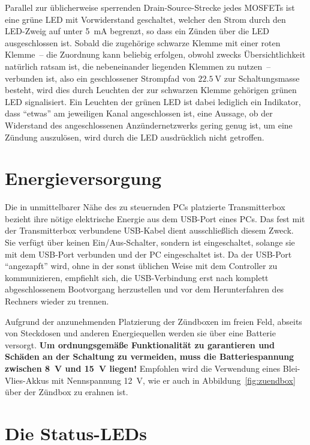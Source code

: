 \documentclass[paper=a4, parskip, numbers=noenddot, toc=listof, headsepline]{scrbook}
\begin{document}
			Parallel zur üblicherweise sperrenden Drain-Source-Strecke jedes MOSFETs ist eine grüne LED mit Vorwiderstand geschaltet, welcher den Strom durch den LED-Zweig auf unter \SI{5}{\milli\ampere} begrenzt, so dass ein Zünden über die LED ausgeschlossen ist. Sobald die zugehörige schwarze Klemme mit einer roten Klemme~-- die Zuordnung kann beliebig erfolgen, obwohl zwecks Übersichtlichkeit natürlich ratsam ist, die nebeneinander liegenden Klemmen zu nutzen~-- verbunden ist, also ein geschlossener Strompfad von $\SI{22,5}{\volt}$ zur Schaltungsmasse besteht, wird dies durch Leuchten der zur schwarzen Klemme gehörigen grünen LED signalisiert. Ein Leuchten der grünen LED ist dabei lediglich ein Indikator, dass \enquote{etwas} am jeweiligen Kanal angeschlossen ist, eine Aussage, ob der Widerstand des angeschlossenen Anzündernetzwerks gering genug ist, um eine Zündung auszulösen, wird durch die LED ausdrücklich nicht getroffen.

		\section{Energieversorgung}

			Die in unmittelbarer Nähe des zu steuernden PCs platzierte Transmitterbox bezieht ihre nötige elektrische Energie aus dem USB-Port eines PCs. Das fest mit der Transmitterbox verbundene USB-Kabel dient ausschließlich diesem Zweck. Sie verfügt über keinen Ein/Aus-Schalter, sondern ist eingeschaltet, solange sie mit dem USB-Port verbunden und der PC eingeschaltet ist. Da der USB-Port \enquote{angezapft} wird, ohne in der sonst üblichen Weise mit dem Controller zu kommunizieren, empfiehlt sich, die USB-Verbindung erst nach komplett abgeschlossenem Bootvorgang herzustellen und vor dem Herunterfahren des Rechners wieder zu trennen.

			Aufgrund der anzunehmenden Platzierung der Zündboxen im freien Feld, abseits von Steckdosen und anderen Energiequellen werden sie über eine Batterie versorgt. \textbf{Um ordnungsgemäße Funktionalität zu garantieren und Schäden an der Schaltung zu vermeiden, muss die Batteriespannung zwischen \SI{8}{\volt} und \SI{15}{\volt} liegen!} Empfohlen wird die Verwendung eines Blei-Vlies-Akkus mit Nennspannung \SI{12}{\volt}, wie er auch in Abbildung~\ref{fig:zuendbox} über der Zündbox zu erahnen ist.

		\section{Die Status-LEDs}
			\label{ch:leds}
\end{document}
